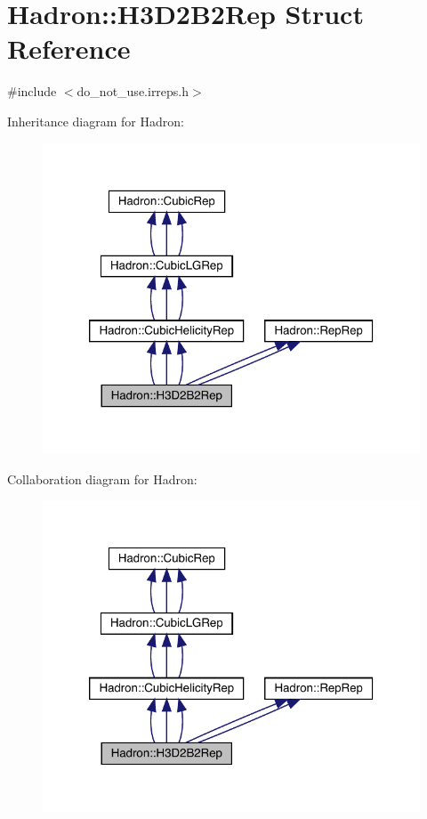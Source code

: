 \hypertarget{structHadron_1_1H3D2B2Rep}{}\section{Hadron\+:\+:H3\+D2\+B2\+Rep Struct Reference}
\label{structHadron_1_1H3D2B2Rep}


{\ttfamily \#include $<$do\+\_\+not\+\_\+use.\+irreps.\+h$>$}



Inheritance diagram for Hadron\+:
\nopagebreak
\begin{figure}[H]
\begin{center}
\leavevmode
\includegraphics[width=320pt]{d6/d4a/structHadron_1_1H3D2B2Rep__inherit__graph}
\end{center}
\end{figure}


Collaboration diagram for Hadron\+:
\nopagebreak
\begin{figure}[H]
\begin{center}
\leavevmode
\includegraphics[width=320pt]{dc/d4b/structHadron_1_1H3D2B2Rep__coll__graph}
\end{center}
\end{figure}
